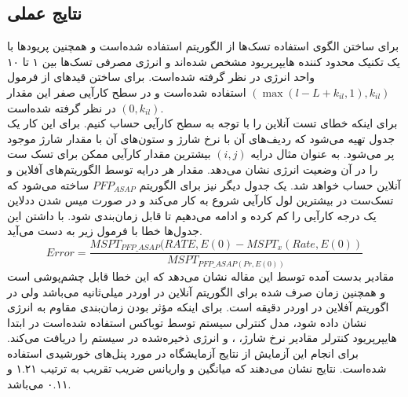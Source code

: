 \documentclass[a4paper, 11pt]{article}
\begin{document}
\subsection{نتایج عملی}
برای ساختن الگوی استفاده تسک‌ها از الگوریتم
استفاده شده‌است و همچنین پریود‌ها با یک تکنیک محدود کننده هایپرپریود مشخص شده‌اند و انرژی
مصرفی تسک‌ها بین ۱ تا ۱۰ واحد انرژی در نظر گرفته شده‌است.
برای ساختن قید‌های
از فرمول
$(\max(l - L + k_{il},1), k_{il})$
استفاده شده‌است و در سطح کارآیی صفر این مقدار
$(0,k_{il})$
در نظر گرفته شده‌است. \\
برای اینکه خطای تست آنلاین را با توجه به سطح کارآیی حساب کنیم.
برای این کار یک جدول تهیه می‌شود که ردیف‌های آن با نرخ شارژ و ستون‌های آن با مقدار شارژ
موجود پر می‌شود. به عنوان مثال درایه
$(i,j)$
بیشترین مقدار کارآیی ممکن برای تسک‌ ست را در آن وضعیت انرژی نشان می‌دهد.
مقدار هر درایه توسط الگوریتم‌های آفلاین و آنلاین حساب خواهد شد. یک جدول دیگر نیز برای
الگوریتم
$PFP_{ASAP}$
ساخته می‌شود که تسک‌ست در بیشترین لول کارآیی شروع به کار می‌کند و در صورت میس شدن ددلاین
یک درجه کارآیی را کم کرده و ادامه می‌دهیم تا قابل زمان‌بندی شود.
با داشتن این جدول‌ها خطا با فرمول زیر به دست می‌آید.
\begin{equation}
    Error = \frac{MSPT_{PFP\_ASAP}(RATE,E(0) - MSPT_x(Rate, E(0))}
{MSPT_{PFP\_ASAP(Pr, E(0))}}
\end{equation}
مقادیر بدست آمده توسط این مقاله نشان می‌دهد که این خطا قابل چشم‌پوشی است و همچنین
زمان صرف شده برای الگوریتم آنلاین در اوردر میلی‌ثانیه می‌باشد ولی در اگوریتم آفلاین در اوردر دقیقه
است.
برای اینکه مؤثر بودن زمان‌بندی مقاوم به انرژی نشان داده شود، مدل کنترلی سیستم توسط توباکس
استفاده شده‌است در ابتدا هایپرپریود کنترلر مقادیر نرخ شارژ، 
،
و انرژی ذخیره‌شده در سیستم را دریافت می‌کند. برای انجام این آزمایش از نتایج
آزمایشگاه
در مورد پنل‌های خورشیدی استفاده شده‌است.
نتایج نشان می‌دهند که میانگین و واریانس ضریب تقریب به ترتیب ۱.۲۱ و ۰.۱۱ می‌باشد.
\end{document}
